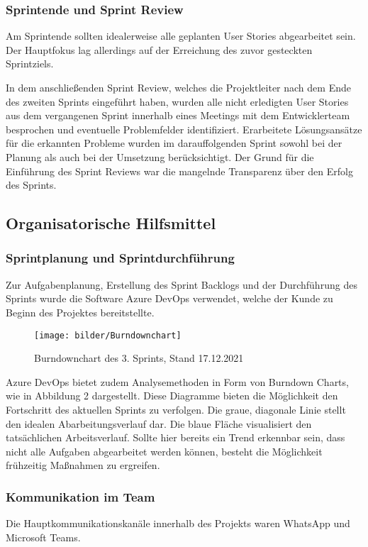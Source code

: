 \subsubsection{Sprintende und Sprint Review}
Am Sprintende sollten idealerweise alle geplanten User Stories abgearbeitet sein. Der Hauptfokus lag allerdings auf der Erreichung des zuvor gesteckten Sprintziels. 

In dem anschließenden Sprint Review, welches die Projektleiter nach dem Ende des zweiten Sprints eingeführt haben, wurden alle nicht erledigten User Stories aus dem vergangenen Sprint innerhalb eines Meetings mit dem Entwicklerteam besprochen und eventuelle Problemfelder identifiziert. Erarbeitete Lösungsansätze für die erkannten Probleme wurden im darauffolgenden Sprint sowohl bei der Planung als auch bei der Umsetzung berücksichtigt. Der Grund für die Einführung des Sprint Reviews war die mangelnde Transparenz über den Erfolg des Sprints.  

\subsection{Organisatorische Hilfsmittel}
\subsubsection{Sprintplanung und Sprintdurchführung}
Zur Aufgabenplanung, Erstellung des Sprint Backlogs und der Durchführung des Sprints wurde die Software Azure DevOps verwendet, welche der Kunde zu Beginn des Projektes bereitstellte. 
\begin{figure}[H]
  \centering
    \texttt{[image: bilder/Burndownchart]}
    \caption{Burndownchart des 3. Sprints, Stand 17.12.2021}
\end{figure}
Azure DevOps bietet zudem Analysemethoden in Form von Burndown Charts, wie in Abbildung 2 dargestellt. Diese Diagramme bieten die Möglichkeit den Fortschritt des aktuellen Sprints zu verfolgen. Die graue, diagonale Linie stellt den idealen Abarbeitungsverlauf dar. Die blaue Fläche visualisiert den tatsächlichen Arbeitsverlauf. Sollte hier bereits ein Trend erkennbar sein, dass nicht alle Aufgaben abgearbeitet werden können, besteht die Möglichkeit frühzeitig Maßnahmen zu ergreifen. 
\subsubsection{Kommunikation im Team}
Die Hauptkommunikationskanäle innerhalb des Projekts waren WhatsApp und Microsoft Teams.


